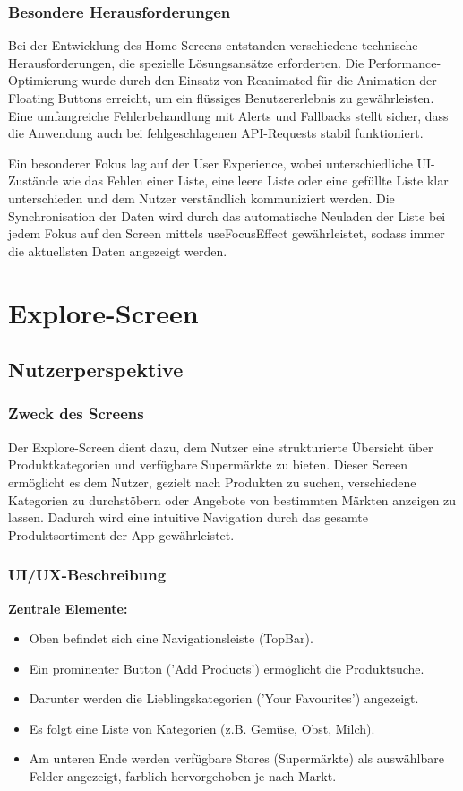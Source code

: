 \subsubsection{Besondere Herausforderungen}
Bei der Entwicklung des Home-Screens entstanden verschiedene technische Herausforderungen, die spezielle Lösungsansätze erforderten. Die Performance-Optimierung wurde durch den Einsatz von Reanimated für die Animation der Floating Buttons erreicht, um ein flüssiges Benutzererlebnis zu gewährleisten. Eine umfangreiche Fehlerbehandlung mit Alerts und Fallbacks stellt sicher, dass die Anwendung auch bei fehlgeschlagenen API-Requests stabil funktioniert.

Ein besonderer Fokus lag auf der User Experience, wobei unterschiedliche UI-Zustände wie das Fehlen einer Liste, eine leere Liste oder eine gefüllte Liste klar unterschieden und dem Nutzer verständlich kommuniziert werden. Die Synchronisation der Daten wird durch das automatische Neuladen der Liste bei jedem Fokus auf den Screen mittels useFocusEffect gewährleistet, sodass immer die aktuellsten Daten angezeigt werden.

\section{Explore-Screen}
\label{sec:explore_screen}

\subsection{Nutzerperspektive}

\subsubsection{Zweck des Screens}
Der Explore-Screen dient dazu, dem Nutzer eine strukturierte Übersicht über Produktkategorien und verfügbare Supermärkte zu bieten. Dieser Screen ermöglicht es dem Nutzer, gezielt nach Produkten zu suchen, verschiedene Kategorien zu durchstöbern oder Angebote von bestimmten Märkten anzeigen zu lassen. Dadurch wird eine intuitive Navigation durch das gesamte Produktsortiment der App gewährleistet.

\subsubsection{UI/UX-Beschreibung}

\textbf{Zentrale Elemente:}
\begin{itemize}
    \item Oben befindet sich eine Navigationsleiste (TopBar).
    \item Ein prominenter Button ('Add Products') ermöglicht die Produktsuche.
    \item Darunter werden die Lieblingskategorien ('Your Favourites') angezeigt.
    \item Es folgt eine Liste von Kategorien (z.B. Gemüse, Obst, Milch).
    \item Am unteren Ende werden verfügbare Stores (Supermärkte) als auswählbare Felder angezeigt, farblich hervorgehoben je nach Markt.
\end{itemize}

